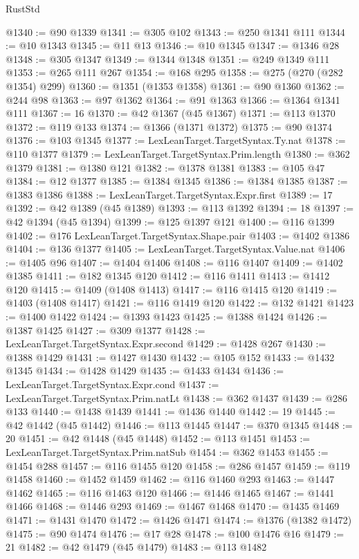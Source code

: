 \begin{lexlean}{RustStd}
\begin{coremodule}
@1340 := @90 @1339
@1341 := @305 @102
@1343 := @250 @1341 @111
@1344 := @10 @1343
@1345 := @11 @13
@1346 := @10 @1345
@1347 := @1346 @28
@1348 := @305 @1347
@1349 := @1344 @1348
@1351 := @249 @1349 @111
@1353 := @265 @111 @267
@1354 := @168 @295
@1358 := @275 (@270 (@282 @1354) @299)
@1360 := @1351 (@1353 @1358)
@1361 := @90 @1360
@1362 := @244 @98
@1363 := @97 @1362
@1364 := @91 @1363
@1366 := @1364 @1341 @111
@1367 := 16
@1370 := @42 @1367 (@45 @1367)
@1371 := @113 @1370
@1372 := @119 @133
@1374 := @1366 (@1371 @1372)
@1375 := @90 @1374
@1376 := @103 @1345
@1377 := LexLeanTarget.TargetSyntax.Ty.nat
@1378 := @110 @1377
@1379 := LexLeanTarget.TargetSyntax.Prim.length
@1380 := @362 @1379
@1381 := @1380 @121
@1382 := @1378 @1381
@1383 := @105 @47
@1384 := @12 @1377
@1385 := @1384 @1345
@1386 := @1384 @1385
@1387 := @1383 @1386
@1388 := LexLeanTarget.TargetSyntax.Expr.first
@1389 := 17
@1392 := @42 @1389 (@45 @1389)
@1393 := @113 @1392
@1394 := 18
@1397 := @42 @1394 (@45 @1394)
@1399 := @125 @1397 @121
@1400 := @116 @1399
@1402 := @176 LexLeanTarget.TargetSyntax.Shape.pair
@1403 := @1402 @1386
@1404 := @136 @1377
@1405 := LexLeanTarget.TargetSyntax.Value.nat
@1406 := @1405 @96
@1407 := @1404 @1406
@1408 := @116 @1407
@1409 := @1402 @1385
@1411 := @182 @1345 @120
@1412 := @116 @1411
@1413 := @1412 @120
@1415 := @1409 (@1408 @1413)
@1417 := @116 @1415 @120
@1419 := @1403 (@1408 @1417)
@1421 := @116 @1419 @120
@1422 := @132 @1421
@1423 := @1400 @1422
@1424 := @1393 @1423
@1425 := @1388 @1424
@1426 := @1387 @1425
@1427 := @309 @1377
@1428 := LexLeanTarget.TargetSyntax.Expr.second
@1429 := @1428 @267
@1430 := @1388 @1429
@1431 := @1427 @1430
@1432 := @105 @152
@1433 := @1432 @1345
@1434 := @1428 @1429
@1435 := @1433 @1434
@1436 := LexLeanTarget.TargetSyntax.Expr.cond
@1437 := LexLeanTarget.TargetSyntax.Prim.natLt
@1438 := @362 @1437
@1439 := @286 @133
@1440 := @1438 @1439
@1441 := @1436 @1440
@1442 := 19
@1445 := @42 @1442 (@45 @1442)
@1446 := @113 @1445
@1447 := @370 @1345
@1448 := 20
@1451 := @42 @1448 (@45 @1448)
@1452 := @113 @1451
@1453 := LexLeanTarget.TargetSyntax.Prim.natSub
@1454 := @362 @1453
@1455 := @1454 @288
@1457 := @116 @1455 @120
@1458 := @286 @1457
@1459 := @119 @1458
@1460 := @1452 @1459
@1462 := @116 @1460 @293
@1463 := @1447 @1462
@1465 := @116 @1463 @120
@1466 := @1446 @1465
@1467 := @1441 @1466
@1468 := @1446 @293
@1469 := @1467 @1468
@1470 := @1435 @1469
@1471 := @1431 @1470
@1472 := @1426 @1471
@1474 := @1376 (@1382 @1472)
@1475 := @90 @1474
@1476 := @17 @28
@1478 := @100 @1476 @16
@1479 := 21
@1482 := @42 @1479 (@45 @1479)
@1483 := @113 @1482

\end{coremodule}
\end{lexlean}
